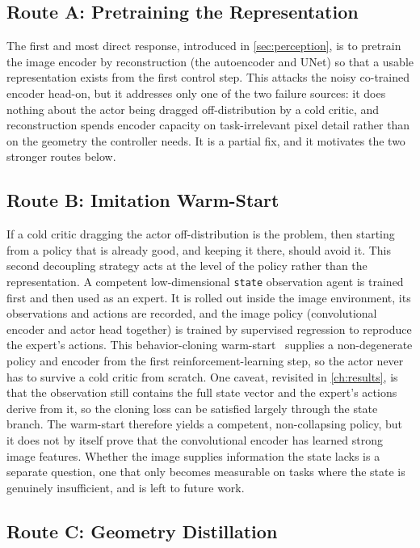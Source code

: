 \subsection{Route A: Pretraining the Representation}

The first and most direct response, introduced in \cref{sec:perception}, is to pretrain the image encoder by reconstruction (the autoencoder and UNet) so that a usable representation exists from the first control step. This attacks the noisy co-trained encoder head-on, but it addresses only one of the two failure sources: it does nothing about the actor being dragged off-distribution by a cold critic, and reconstruction spends encoder capacity on task-irrelevant pixel detail rather than on the geometry the controller needs. It is a partial fix, and it motivates the two stronger routes below.

\subsection{Route B: Imitation Warm-Start}

If a cold critic dragging the actor off-distribution is the problem, then starting from a policy that is already good, and keeping it there, should avoid it. This second decoupling strategy acts at the level of the policy rather than the representation. A competent low-dimensional \texttt{state} observation agent is trained first and then used as an expert. It is rolled out inside the image environment, its observations and actions are recorded, and the image policy (convolutional encoder and actor head together) is trained by supervised regression to reproduce the expert's actions. This behavior-cloning warm-start~\cite{bojarski2016end} supplies a non-degenerate policy and encoder from the first reinforcement-learning step, so the actor never has to survive a cold critic from scratch. One caveat, revisited in \cref{ch:results}, is that the observation still contains the full state vector and the expert's actions derive from it, so the cloning loss can be satisfied largely through the state branch. The warm-start therefore yields a competent, non-collapsing policy, but it does not by itself prove that the convolutional encoder has learned strong image features. Whether the image supplies information the state lacks is a separate question, one that only becomes measurable on tasks where the state is genuinely insufficient, and is left to future work.

\subsection{Route C: Geometry Distillation}

